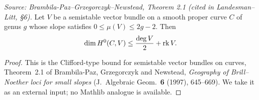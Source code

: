 \begin{theorem}
  \label{thm:clifford-vector-bundles}
  \textit{Source: Brambila-Paz--Grzegorczyk--Newstead, Theorem 2.1 (cited in Landesman--Litt, \S6).}
  Let $V$ be a semistable vector bundle on a smooth proper curve $C$ of genus $g$
  whose slope satisfies $0 \leq \mu(V) \leq 2g - 2$. Then
  \[
    \dim H^0(C, V) \leq \frac{\deg V}{2} + \operatorname{rk} V.
  \]
\end{theorem}

\begin{proof}
  This is the Clifford-type bound for semistable vector bundles on curves,
  Theorem~2.1 of Brambila-Paz, Grzegorczyk and Newstead, \emph{Geography of
  Brill--Noether loci for small slopes} (J.\ Algebraic Geom.\ \textbf{6} (1997),
  645--669). We take it as an external input; no Mathlib analogue is available.
\end{proof}


